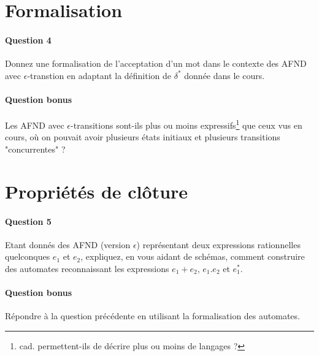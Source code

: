 \documentclass{article}[11pt]
\theoremstyle{definition}
\begin{document}
\section{Formalisation}

\paragraph*{Question 4} Donnez une formalisation de l'acceptation d'un mot dans le contexte des AFND avec $\epsilon$-transtion en adaptant la définition de $\delta^*$ donnée dans le cours.

\paragraph*{Question bonus} Les AFND avec $\epsilon$-transitions sont-ils plus ou moins expressifs\footnote{cad. permettent-ils de décrire plus ou moins de langages ?} que ceux vus en cours, où on pouvait avoir plusieurs états initiaux et plusieurs transitions "concurrentes" ?


\section{Propriétés de clôture}

\paragraph*{Question 5} Etant donnés des AFND (version $\epsilon$) représentant deux expressions rationnelles quelconques $e_1$ et $e_2$, expliquez, en vous aidant de schémas, comment construire des automates reconnaissant les expressions $e_1 + e_2$, $e_1.e_2$ et $e_1^*$.

\paragraph*{Question bonus} Répondre à la question précédente en utilisant la formalisation des automates.


\end{document}

